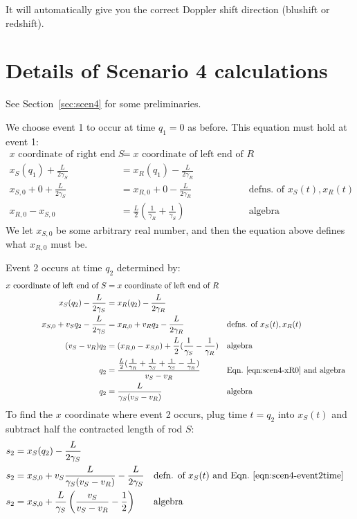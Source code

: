 \documentclass[a4paper]{article}
\theoremstyle{plain}
\theoremstyle{definition}
\begin{document}
It will automatically give you the correct Doppler shift direction
(blushift or redshift).


\section{Details of Scenario 4 calculations}
\label{app:scen4}

See Section~\ref{sec:scen4} for some preliminaries.

We choose event 1 to occur at time $q_1=0$ as before.
This equation must hold at event 1:
\begin{align}
\text{$x$ coordinate of right end of $S$} & = \text{$x$ coordinate of left end of $R$} \nonumber \\
x_S(q_1) + \frac{L}{2\gamma_S} & = x_R(q_1) - \frac{L}{2\gamma_R} \nonumber \\
x_{S,0} + 0 + \frac{L}{2\gamma_S} & = x_{R,0} + 0 - \frac{L}{2\gamma_R} & & \text{defns. of $x_S(t), x_R(t)$} \nonumber \\
x_{R,0} - x_{S,0} & = \frac{L}{2} ( \frac{1}{\gamma_R} + \frac{1}{\gamma_S} ) & & \text{algebra} \label{eqn:scen4-xR0}
\end{align}
We let $x_{S,0}$ be some arbitrary real number, and then the equation
above defines what $x_{R,0}$ must be.

Event 2 occurs at time $q_2$ determined by:
\begin{align}
\text{$x$ coordinate of left end of $S$} & = \text{$x$ coordinate of left end of $R$} \nonumber \\
x_S(q_2) - \frac{L}{2\gamma_S} & = x_R(q_2) - \frac{L}{2\gamma_R} \nonumber \\
x_{S,0} + v_S q_2 - \frac{L}{2\gamma_S} & = x_{R,0} + v_R q_2 - \frac{L}{2\gamma_R} & & \text{defns. of $x_S(t), x_R(t)$} \nonumber \\
(v_S - v_R) q_2 & = (x_{R,0} - x_{S,0}) + \frac{L}{2} ( \frac{1}{\gamma_S} - \frac{1}{\gamma_R} ) & & \text{algebra} \nonumber \\
q_2 & = \frac{ \frac{L}{2} ( \frac{1}{\gamma_R} + \frac{1}{\gamma_S} + \frac{1}{\gamma_S} - \frac{1}{\gamma_R})}{v_S - v_R} & & \text{Eqn.~\eqref{eqn:scen4-xR0} and algebra} \nonumber \\
q_2 & = \frac{L}{\gamma_S(v_S - v_R)} & & \text{algebra} \label{eqn:scen4-event2time}
\end{align}
To find the $x$ coordinate where event 2 occurs, plug time $t=q_2$
into $x_S(t)$ and subtract half the contracted length of rod $S$:
\begin{align}
s_2 & = x_S(q_2) - \frac{L}{2\gamma_S} \nonumber \\
s_2 & = x_{S,0} + v_S \frac{L}{\gamma_S(v_S - v_R)} - \frac{L}{2\gamma_S} & & \text{defn. of $x_S(t)$ and Eqn.~\eqref{eqn:scen4-event2time}} \nonumber \\
s_2 & = x_{S,0} + \frac{L}{\gamma_S} \left( \frac{v_S}{v_S - v_R} - \frac{1}{2} \right) & & \text{algebra} \label{eqn:scen4-event2xcoord}
\end{align}
\end{document}
